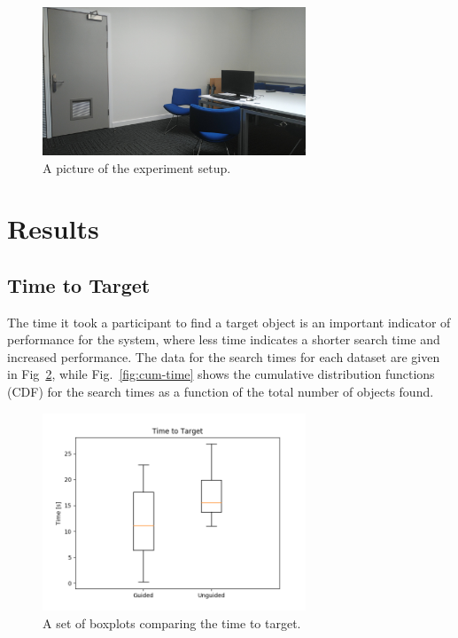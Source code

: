 \documentclass[runningheads]{llncs}
\begin{document}
\begin{figure}
  \centering
  \includegraphics[width=0.7\textwidth]{figures/environment.png}
  \caption{A picture of the experiment setup. }\label{fig:boxplot-time}
\end{figure}

\section{Results}\label{sec:results}

\subsection{Time to Target}

The time it took a participant to find a target object is an important indicator of performance for the system, where less time indicates a shorter search time and increased performance.
The data for the search times for each dataset are given in Fig~\ref{fig:boxplot-time}, while Fig.~\ref{fig:cum-time} shows the cumulative distribution functions (CDF) for the search times as a function of the total number of objects found.

\begin{figure}
  \centering
  \includegraphics[width=0.7\textwidth]{figures/boxplot_time_to_target.png}
  \caption{A set of boxplots comparing the time to target. }\label{fig:boxplot-time}
\end{figure}
\end{document}

